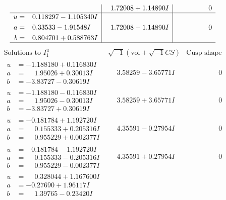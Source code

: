 \documentclass[1p]{elsarticle_modified}
\theoremstyle{definition}
\newcommand{\I}{\sqrt{-1}}
\begin{document}
$$\begin{array}{c|c|c}
 & \phantom{-}1.72008 + 1.14890 I & \phantom{-0.000000 } 0 \\ \hline\begin{aligned}
u &= \phantom{-}0.118297 - 1.105340 I \\
a &= \phantom{-}0.33533 - 1.91548 I \\
b &= \phantom{-}0.804701 + 0.588763 I\end{aligned}
 & \phantom{-}1.72008 - 1.14890 I & \phantom{-0.000000 } 0\\
 \hline 
 \end{array}$$\newpage$$\begin{array}{c|c|c}  
\text{Solutions to }I^u_{1}& \I (\text{vol} + \sqrt{-1}CS) & \text{Cusp shape}\\
 \hline 
\begin{aligned}
u &= -1.188180 + 0.116830 I \\
a &= \phantom{-}1.95026 + 0.30013 I \\
b &= -3.83727 - 0.30619 I\end{aligned}
 & \phantom{-}3.58259 - 3.65771 I & \phantom{-0.000000 } 0 \\ \hline\begin{aligned}
u &= -1.188180 - 0.116830 I \\
a &= \phantom{-}1.95026 - 0.30013 I \\
b &= -3.83727 + 0.30619 I\end{aligned}
 & \phantom{-}3.58259 + 3.65771 I & \phantom{-0.000000 } 0 \\ \hline\begin{aligned}
u &= -0.181784 + 1.192720 I \\
a &= \phantom{-}0.155333 + 0.205316 I \\
b &= \phantom{-}0.955229 + 0.002377 I\end{aligned}
 & \phantom{-}4.35591 - 0.27954 I & \phantom{-0.000000 } 0 \\ \hline\begin{aligned}
u &= -0.181784 - 1.192720 I \\
a &= \phantom{-}0.155333 - 0.205316 I \\
b &= \phantom{-}0.955229 - 0.002377 I\end{aligned}
 & \phantom{-}4.35591 + 0.27954 I & \phantom{-0.000000 } 0 \\ \hline\begin{aligned}
u &= \phantom{-}0.328044 + 1.167600 I \\
a &= -0.27690 + 1.96117 I \\
b &= \phantom{-}1.39765 - 0.23420 I\end{aligned}

\end{array}$$
\end{document}
